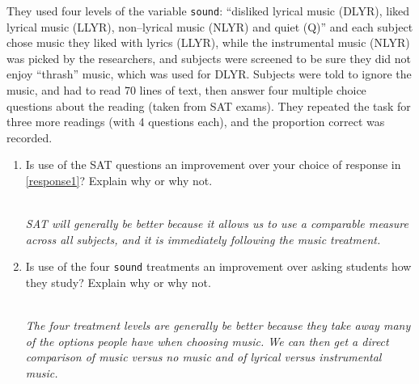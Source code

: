\begin{enumerate}
  
   They used four levels of the variable \verb|sound|: ``disliked
   lyrical music (DLYR), liked lyrical music (LLYR), non--lyrical
   music (NLYR) and quiet (Q)'' and each subject chose music they
   liked with lyrics (LLYR), while the instrumental music (NLYR) was
   picked by the researchers, and subjects were screened to be sure they
   did not enjoy ``thrash'' music, which was used for DLYR.  Subjects
   were told to ignore the music, and had to read 70 lines of text,
   then answer four multiple choice questions about the reading (taken
   from SAT exams). They repeated the task for three more readings
   (with 4 questions each), and the proportion correct was recorded.

  \begin{enumerate}
    \item  Is use of the SAT questions an improvement over your choice
      of response in \ref{response1}?  Explain why or why not.
\begin{students}
        \vspace{4cm}
\end{students}
\begin{key}
  \\ {\it SAT will generally be better because it allows us to use a
    comparable measure across all subjects, and it is immediately
    following the music treatment.}
\end{key}
   \item   Is use of the four \verb|sound| treatments an improvement
     over asking students how they study?  Explain why or why not.
\begin{students}
        \vspace{4cm}
\end{students}
\begin{key}
  \\ {\it The four treatment levels are generally be better because
    they take away many of the options people have when choosing music.
      We can then get a direct comparison of music versus no music and
      of lyrical versus instrumental music.}
\end{key}
  
  \end{enumerate}


\end{enumerate}
